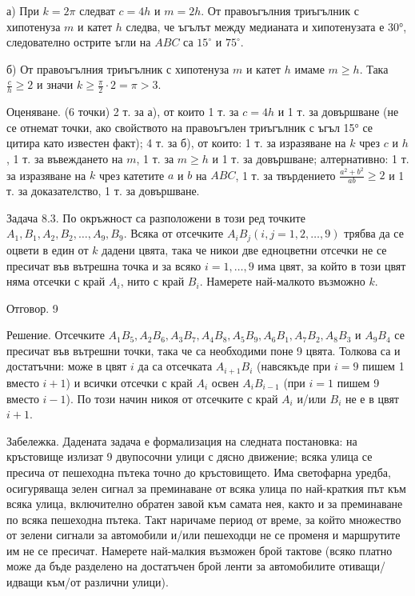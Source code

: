 а) При $k=2 \pi$ следват $c=4 h$ и $m=2 h$. От правоъгълния триъгълник с хипотенуза $m$ и катет $h$ следва, че ъгълът между медианата и хипотенузата е 30°, следователно острите ъгли на $A B C$ са $15^{\circ}$ и $75^{\circ}$.

б) От правоъгълния триъгълник с хипотенуза $m$ и катет $h$ имаме $m \geq h$. Така $\frac{c}{h} \geq 2$ и значи $k \geq \frac{\pi}{2} \cdot 2=\pi>3$.

Оценяване. (6 точки) 2 т. за а), от които 1 т. за $c=4 h$ и 1 т. за довършване (не се отнемат точки, ако свойството на правоъгълен триъгълник с ъгъл 15° се цитира като известен факт); 4 т. за б), от които: 1 т. за изразяване на $k$ чрез $c$ и $h$, 1 т. за въвеждането на $m$, 1 т. за $m \geq h$ и 1 т. за довършване; алтернативно: 1 т. за изразяване на $k$ чрез катетите $a$ и $b$ на $A B C$, 1 т. за твърдението $\frac{a^{2}+b^{2}}{a b} \geq 2$ и 1 т. за доказателство, 1 т. за довършване.

Задача 8.3. По окръжност са разположени в този ред точките $A_{1}, B_{1}, A_{2}, B_{2}, \ldots, A_{9}, B_{9}$. Всяка от отсечките $A_{i} B_{j}(i, j=1,2, \ldots, 9)$ трябва да се оцвети в един от $k$ дадени цвята, така че никои две едноцветни отсечки не се пресичат във вътрешна точка и за всяко $i=1, \ldots, 9$ има цвят, за който в този цвят няма отсечки с край $A_{i}$, нито с край $B_{i}$. Намерете най-малкото възможно $k$.

Отговор. 9

Решение. Отсечките $A_{1} B_{5}, A_{2} B_{6}, A_{3} B_{7}, A_{4} B_{8}, A_{5} B_{9}, A_{6} B_{1}, A_{7} B_{2}, A_{8} B_{3}$ и $A_{9} B_{4}$ се пресичат във вътрешни точки, така че са необходими поне 9 цвята. Толкова са и достатъчни: може в цвят $i$ да са отсечката $A_{i+1} B_{i}$ (навсякъде при $i=9$ пишем 1 вместо $i+1$) и всички отсечки с край $A_{i}$ освен $A_{i} B_{i-1}$ (при $i=1$ пишем 9 вместо $i-1$). По този начин никоя от отсечките с край $A_{i}$ и/или $B_{i}$ не е в цвят $i+1$.

Забележка. Дадената задача е формализация на следната постановка: на кръстовище излизат 9 двупосочни улици с дясно движение; всяка улица се пресича от пешеходна пътека точно до кръстовището. Има светофарна уредба, осигуряваща зелен сигнал за преминаване от всяка улица по най-краткия път към всяка улица, включително обратен завой към самата нея, както и за преминаване по всяка пешеходна пътека. Такт наричаме период от време, за който множество от зелени сигнали за автомобили и/или пешеходци не се променя и маршрутите им не се пресичат. Намерете най-малкия възможен брой тактове (всяко платно може да бъде разделено на достатъчен брой ленти за автомобилите отиващи/идващи към/от различни улици).


